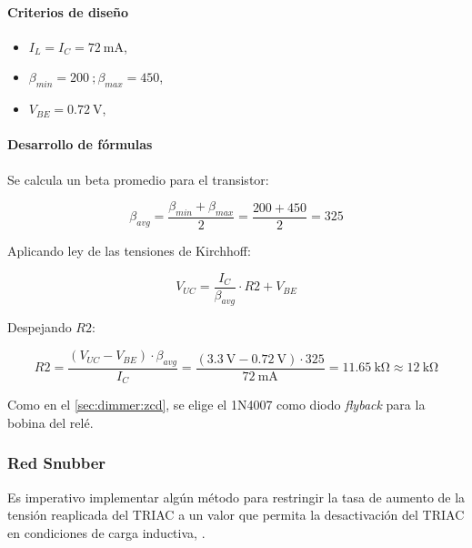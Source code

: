\paragraph{Criterios de diseño}

\begin{itemize}
    \item $I_L = I_C = \SI{72}{\milli\ampere}$, \parencite{SRD-RELAY}
    \item $\beta_{min} = 200\ ; \beta_{max} = 450$, \parencite{BC548}
    \item $V_{BE} = \SI{0.72}{\volt}$, \parencite{BC548}
\end{itemize}

\paragraph{Desarrollo de fórmulas}

Se calcula un beta promedio para el transistor:

\begin{equation}
\beta_{avg} = \frac{\beta_{min} + \beta_{max}}{2} = \frac{200 + 450}{2} = 325
\end{equation}

Aplicando ley de las tensiones de Kirchhoff:
\vspace{-0.25cm}

\begin{equation}
V_{UC} = \frac{I_C}{\beta_{avg}} \cdot R2 + V_{BE}
\end{equation}

Despejando $R2$:

\begin{equation}
R2 = \frac{(V_{UC} - V_{BE}) \cdot \beta_{avg}}{I_C} = \frac{(\SI{3.3}{\volt} - \SI{0.72}{\volt}) \cdot 325}{\SI{72}{\milli\ampere}} = \SI{11.65}{\kilo\ohm} \approx \SI{12}{\kilo\ohm}
\end{equation}

Como en el \cref{sec:dimmer:zcd}, se elige el 1N4007 como diodo \textit{flyback} para la bobina del relé.

\subsubsection{Red Snubber}

Es imperativo implementar algún método para restringir la tasa de aumento de la tensión reaplicada del TRIAC a un valor que permita la desactivación del TRIAC en condiciones de carga inductiva, \parencite{ON-ThyristorHandbook}.

